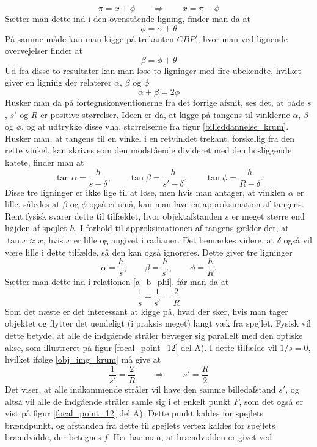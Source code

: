 $$\pi = x + \phi \qquad \Rightarrow \qquad x = \pi - \phi$$
Sætter man dette ind i den ovenstående ligning, finder man da at
$$\phi = \alpha + \theta$$
På samme måde kan man kigge på trekanten $CBP'$, hvor man ved lignende overvejelser finder at
$$\beta = \phi + \theta$$
Ud fra disse to resultater kan man løse to ligninger med fire ubekendte, hvilket giver en ligning der relaterer $\alpha$, $\beta$ og $\phi$
\begin{equation}
\alpha + \beta = 2 \phi
\label{a_b_phi}
\end{equation}
Husker man da på fortegnskonventionerne fra det forrige afsnit, ses det, at både $s$, $s'$ og $R$ er positive størrelser. Ideen er da, at kigge på tangens til vinklerne $\alpha$, $\beta$ og $\phi$, og at udtrykke disse vha. størrelserne fra figur \ref{billeddannelse_krum}. Husker man, at tangens til en vinkel i en retvinklet trekant, forskellig fra den rette vinkel, kan skrives som den modstående divideret med den hosliggende katete, finder man at
$$\tan \alpha = \frac{h}{s - \delta}, \quad \quad \tan \beta = \frac{h}{s' - \delta}, \quad \quad \tan \phi = \frac{h}{R - \delta}. $$
Disse tre ligninger er ikke lige til at løse, men hvis man antager, at vinklen $\alpha$ er lille, således at $\beta$ og $\phi$ også er små, kan man lave en approksimation af tangens. Rent fysisk svarer dette til tilfældet, hvor objektafstanden $s$ er meget større end højden af spejlet $h$. I forhold til approksimationen af tangens gælder det, at $\tan x \approx x$, hvis $x$ er lille og angivet i radianer. Det bemærkes videre, at $\delta$ også vil være lille i dette tilfælde, så den kan også ignoreres. Dette giver tre ligninger
$$\alpha = \frac{h}{s}, \quad \quad \beta = \frac{h}{s'}, \quad \quad \phi = \frac{h}{R}.$$
Sætter man dette ind i relationen \eqref{a_b_phi}, får man da at
\begin{equation}
\frac{1}{s} + \frac{1}{s'} = \frac{2}{R}
\label{obj_img_krum}
\end{equation}
Som det næste er det interessant at kigge på, hvad der sker, hvis man tager objektet og flytter det uendeligt (i praksis meget) langt væk fra spejlet. Fysisk vil dette betyde, at alle de indgående stråler bevæger sig parallelt med den optiske akse, som illustreret på figur \ref{focal_point_12} del A). I dette tilfælde vil $1/s = 0$, hvilket ifølge \eqref{obj_img_krum} må give at
$$\frac{1}{s'} = \frac{2}{R} \quad \quad \Rightarrow \quad \quad s' = \frac{R}{2}$$
Det viser, at alle indkommende stråler vil have den samme billedafstand $s'$, og altså vil alle de indgående stråler samle sig i et enkelt punkt $F$, som det også er vist på figur \ref{focal_point_12} del A). Dette punkt kaldes for spejlets brændpunkt, og afstanden fra dette  til spejlets vertex kaldes for spejlets brændvidde, der betegnes $f$. Her har man, at brændvidden er givet ved
